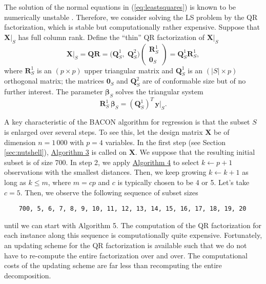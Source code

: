 \documentclass[a4paper,oneside,11pt,DIV=12]{scrartcl}
\begin{document}
The solution of the normal equations in (\ref{eq:leastsquares}) is known
to be numerically unstable \citep[][Chap. 5.3]{golub_loan_1996}. Therefore,
we consider solving the LS problem by the QR factorization, which is
stable but computationally rather expensive. Suppose that $\bm X\vert_S$
has full column rank. Define the ``thin'' QR factorization of
$\bm X \vert_{S}$ \citep[][Chap. 5.3]{golub_loan_1996}
\begin{equation}\label{eq:reg_qr1}
	\bm X \vert_S = \bm Q \bm R =  \big( \bm Q_{S}^1, \;
		\bm Q_{S}^2 \big) \left(\begin{matrix} \bm R_{S}^1 \\
		\bm 0_S \end{matrix}\right) = \bm Q_{S}^1 \bm R_{S}^1,
\end{equation}
\noindent where $\bm R_{S}^1$ is an $(p \times p)$ upper triangular
matrix and $\bm Q_{S}^1$ is an $(\vert S \vert \times p)$ orthogonal
matrix; the matrices $\bm 0_{S}$ and $\bm Q_{S}^2$ are of conformable
size but of no further interest. The parameter $\bm \beta_S$ solves the
triangular system
\begin{equation}\label{eq:reg_qr1_solve}
	\bm R_{S}^1 \, \bm \beta_S  = (\bm Q_{S}^1)^T \, \bm y \vert_S.
\end{equation}

A key characteristic of the BACON algorithm for regression is that the
subset $S$ is enlarged over several steps. To see this, let the design
matrix $\bm X$ be of dimension $n=1\,000$ with $p=4$ variables. In the
first step (see Section \ref{sec:nutshell}), \hyperlink{alg:alg3}{Algorithm 3}
is called on $\bm X$. We suppose that the resulting initial subset is
of size 700. In step 2, we apply \hyperlink{alg:alg4}{Algorithm 4} to
select $k \gets p+1$ observations with the smallest distances. Then, we
keep growing $k \gets k + 1$ as long as $k \leq m$, where $m=cp$ and
$c$ is typically chosen to be 4 or 5. Let's take $c=5$. Then, we observe
the following sequence of subset sizes
\begin{verbatim}
    700, 5, 6, 7, 8, 9, 10, 11, 12, 13, 14, 15, 16, 17, 18, 19, 20
\end{verbatim}
\noindent until we can start with Algorithm 5. The computation of the
QR factorization for each instance along this sequence is computationally
quite expensive. Fortunately, an updating scheme for the QR factorization
is available such that we do not have to re-compute the entire factorization
over and over. The computational costs of the updating scheme are far
less than recomputing the entire decomposition.
\end{document}

